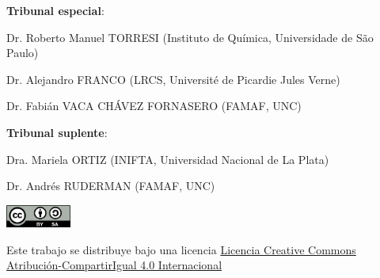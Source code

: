 \textbf{Tribunal especial}:

\hspace{1.5cm} Dr. Roberto Manuel TORRESI (Instituto de Química, Universidade de São Paulo)

\hspace{1.5cm} Dr. Alejandro FRANCO (LRCS, Université de Picardie Jules Verne)

\hspace{1.5cm} Dr. Fabián VACA CHÁVEZ FORNASERO (FAMAF, UNC)

\textbf{Tribunal suplente}:

\hspace{1.5cm} Dra. Mariela ORTIZ (INIFTA, Universidad Nacional de La Plata)

\hspace{1.5cm} Dr. Andrés RUDERMAN (FAMAF, UNC)

\vspace{1.0cm}

\begin{center}
    
    \vfill
    \href{https://creativecommons.org/licenses/by-sa/4.0/deed.es}{
        \includegraphics[height=0.75cm]{Caratula/cc-by-sa.png}
    }

    {\footnotesize 
    Este trabajo se distribuye bajo una licencia
    \href{https://creativecommons.org/licenses/by-sa/4.0/deed.es}{Licencia 
    Creative Commons Atribución-CompartirIgual 4.0 Internacional}
    }

\end{center}
